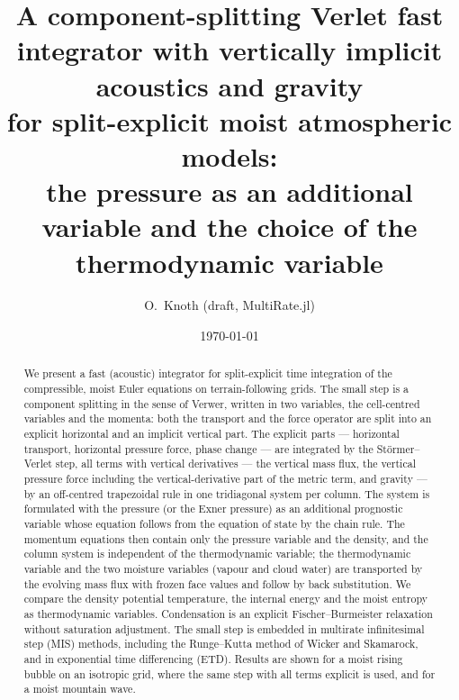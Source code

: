 \documentclass[11pt,a4paper]{article}
\title{A component-splitting Verlet fast integrator with vertically implicit acoustics and gravity\\
for split-explicit moist atmospheric models:\\
the pressure as an additional variable and the choice of the thermodynamic variable}
\author{O.~Knoth (draft, MultiRate.jl)}
\date{\today}
\begin{document}
\maketitle

\begin{abstract}
We present a fast (acoustic) integrator for split-explicit time integration of the compressible,
moist Euler equations on terrain-following grids. The small step is a component splitting in the
sense of Verwer, written in two variables, the cell-centred variables and the momenta: both the
transport and the force operator are split into an explicit horizontal and an implicit vertical part.
The explicit parts --- horizontal transport, horizontal pressure force, phase change --- are
integrated by the Störmer--Verlet step, all terms with vertical derivatives --- the vertical mass flux,
the vertical pressure force including the vertical-derivative part of the metric term, and gravity ---
by an off-centred trapezoidal rule in one tridiagonal system per column. The system is formulated with the pressure (or the Exner pressure) as
an additional prognostic variable whose equation follows from the equation of state by the chain
rule. The momentum equations then contain only the pressure variable and the density, and the
column system is independent of the thermodynamic variable; the thermodynamic variable and the two
moisture variables (vapour and cloud water) are transported by the evolving mass flux with frozen
face values and follow by back substitution. We compare the density potential temperature, the
internal energy and the moist entropy as thermodynamic variables. Condensation is an explicit Fischer--Burmeister
relaxation without saturation adjustment. The small step is embedded in multirate infinitesimal
step (MIS) methods, including the Runge--Kutta method of Wicker and Skamarock, and in exponential
time differencing (ETD). Results are shown for a moist rising bubble on an isotropic grid, where the
same step with all terms explicit is used, and for a moist mountain wave.
\end{abstract}

\tableofcontents

\end{document}
